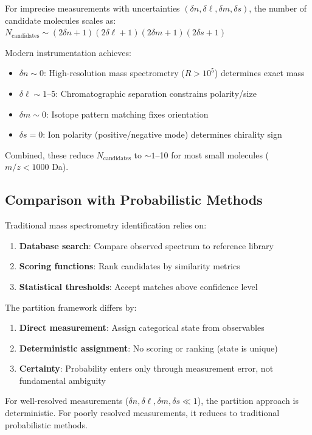 For imprecise measurements with uncertainties $(\delta n, \delta \ell, \delta m, \delta s)$, the number of candidate molecules scales as:
$
N_{\mathrm{candidates}} \sim (2\delta n + 1)(2\delta \ell + 1)(2\delta m + 1)(2\delta s + 1)
$

Modern instrumentation achieves:
\begin{itemize}
    \item $\delta n \sim 0$: High-resolution mass spectrometry ($R > 10^5$) determines exact mass
    \item $\delta \ell \sim 1$–5: Chromatographic separation constrains polarity/size
    \item $\delta m \sim 0$: Isotope pattern matching fixes orientation
    \item $\delta s = 0$: Ion polarity (positive/negative mode) determines chirality sign
\end{itemize}

Combined, these reduce $N_{\mathrm{candidates}}$ to $\sim 1$–10 for most small molecules ($m/z < 1000$ Da).

\subsection{Comparison with Probabilistic Methods}

Traditional mass spectrometry identification relies on:
\begin{enumerate}
    \item \textbf{Database search}: Compare observed spectrum to reference library
    \item \textbf{Scoring functions}: Rank candidates by similarity metrics
    \item \textbf{Statistical thresholds}: Accept matches above confidence level
\end{enumerate}

The partition framework differs by:
\begin{enumerate}
    \item \textbf{Direct measurement}: Assign categorical state from observables
    \item \textbf{Deterministic assignment}: No scoring or ranking (state is unique)
    \item \textbf{Certainty}: Probability enters only through measurement error, not fundamental ambiguity
\end{enumerate}

For well-resolved measurements ($\delta n, \delta \ell, \delta m, \delta s \ll 1$), the partition approach is deterministic. For poorly resolved measurements, it reduces to traditional probabilistic methods.

